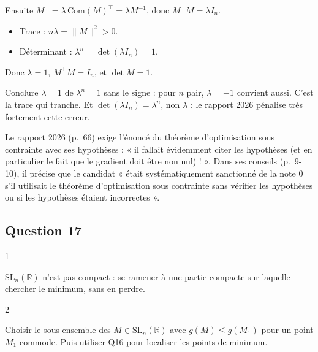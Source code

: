 \documentclass[11pt,a4paper]{article}
\providecommand{\tightlist}{\setlength{\itemsep}{0pt}\setlength{\parskip}{0pt}}
\newcommand{\equationajustee}[1]{%
  \sbox{\boiteequation}{$\displaystyle #1$}%
  \ifdim\wd\boiteequation>\linewidth
    \[\resizebox{\linewidth}{!}{\usebox{\boiteequation}}\]%
  \else
    \[#1\]%
  \fi}
\begin{document}
Ensuite \(M^\top=\lambda\,\mathrm{Com}(M)^\top=\lambda M^{-1}\), donc \(M^\top M=\lambda I_n\).

\begin{itemize}
\tightlist
\item
  Trace : \(n\lambda=\|M\|^2>0\).
\item
  Déterminant : \(\lambda^n=\det(\lambda I_n)=1\).
\end{itemize}

Donc \(\lambda=1\), \(M^\top M=I_n\), et \(\det M=1\).

\equationajustee{\boxed{M\in{\mathrm{SO}}_n(\mathbb R)}}

\begin{piege}

Conclure \(\lambda=1\) de \(\lambda^n=1\) sans le signe : pour \(n\) pair, \(\lambda=-1\) convient aussi. C'est la trace qui tranche. Et \(\det(\lambda I_n)=\lambda^n\), non \(\lambda\) : le rapport 2026 pénalise très fortement cette erreur.

\end{piege}

\begin{jury}

Le rapport 2026 (p.~66) exige l'énoncé du théorème d'optimisation sous contrainte avec ses hypothèses : « il fallait évidemment citer les hypothèses (et en particulier le fait que le gradient doit être non nul) ! ». Dans ses conseils (p.~9-10), il précise que le candidat « était systématiquement sanctionné de la note 0 s'il utilisait le théorème d'optimisation sous contrainte sans vérifier les hypothèses ou si les hypothèses étaient incorrectes ».

\end{jury}

\hypertarget{question-17}{%
\subsection{Question 17}\label{question-17}}

\begin{indication}{1}

\({\mathrm{SL}}_n(\mathbb R)\) n'est pas compact : se ramener à une partie compacte sur laquelle chercher le minimum, sans en perdre.

\end{indication}

\begin{indication}{2}

Choisir le sous-ensemble des \(M\in{\mathrm{SL}}_n(\mathbb R)\) avec \(g(M)\le g(M_1)\) pour un point \(M_1\) commode. Puis utiliser Q16 pour localiser les points de minimum.

\end{indication}
\end{document}
